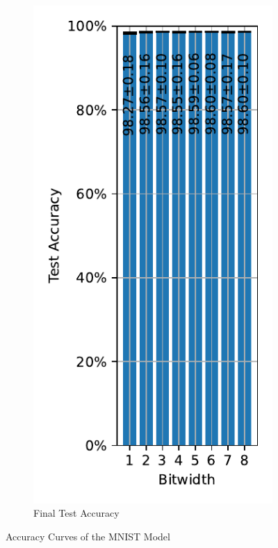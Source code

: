 \begin{figure}[H]
\begin{subfigure}[H]{0.3\textwidth}
                \centering
                \includegraphics[width=\textwidth]{../standard/MNIST/plots/mnist_final_acc.pdf}
                \caption{Final Test Accuracy}
            \end{subfigure}
            \caption{Accuracy Curves of the MNIST Model}
        \end{figure}
    
